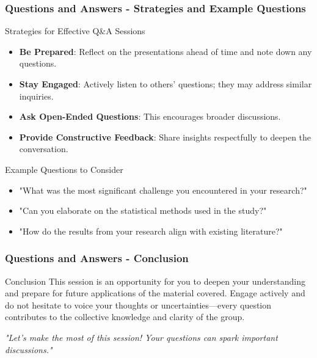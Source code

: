 \documentclass[aspectratio=169]{beamer}
\begin{document}
\begin{frame}[fragile]
    \frametitle{Questions and Answers - Strategies and Example Questions}
    \begin{block}{Strategies for Effective Q\&A Sessions}
        \begin{itemize}
            \item \textbf{Be Prepared}: Reflect on the presentations ahead of time and note down any questions.
            \item \textbf{Stay Engaged}: Actively listen to others' questions; they may address similar inquiries.
            \item \textbf{Ask Open-Ended Questions}: This encourages broader discussions.
            \item \textbf{Provide Constructive Feedback}: Share insights respectfully to deepen the conversation.
        \end{itemize}
    \end{block}

    \begin{block}{Example Questions to Consider}
        \begin{itemize}
            \item "What was the most significant challenge you encountered in your research?"
            \item "Can you elaborate on the statistical methods used in the study?"
            \item "How do the results from your research align with existing literature?"
        \end{itemize}
    \end{block}
\end{frame}

\begin{frame}[fragile]
    \frametitle{Questions and Answers - Conclusion}
    \begin{block}{Conclusion}
        This session is an opportunity for you to deepen your understanding and prepare for future applications of the material covered. Engage actively and do not hesitate to voice your thoughts or uncertainties—every question contributes to the collective knowledge and clarity of the group.
    \end{block}
    \centering
    \textit{"Let’s make the most of this session! Your questions can spark important discussions."}
\end{frame}
\end{document}
